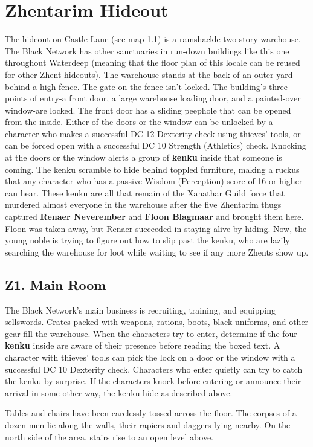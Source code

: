 \documentclass[10pt,a4paper,twoside,twocolumn,openany,nodeprecatedcode]{dndbook}
\begin{document}
\section{Zhentarim Hideout}
The hideout on Castle Lane (see map 1.1) is a ramshackle two-story warehouse. The Black Network has other sanctuaries in run-down buildings like this one throughout Waterdeep (meaning that the floor plan of this locale can be reused for other Zhent hideouts).
The warehouse stands at the back of an outer yard behind a high fence. The gate on the fence isn't locked. The building's three points of entry-a front door, a large warehouse loading door, and a painted-over window-are locked. The front door has a sliding peephole that can be opened from the inside. Either of the doors or the window can be unlocked by a character who makes a successful DC 12 Dexterity check using thieves' tools, or can be forced open with a successful DC 10 Strength (Athletics) check.
Knocking at the doors or the window alerts a group of \textbf{kenku} inside that someone is coming. The kenku scramble to hide behind toppled furniture, making a ruckus that any character who has a passive Wisdom (Perception) score of 16 or higher can hear. These kenku are all that remain of the Xanathar Guild force that murdered almost everyone in the warehouse after the five Zhentarim thugs captured \textbf{Renaer Neverember} and \textbf{Floon Blagmaar} and brought them here. Floon was taken away, but Renaer succeeded in staying alive by hiding. Now, the young noble is trying to figure out how to slip past the kenku, who are lazily searching the warehouse for loot while waiting to see if any more Zhents show up.
\subsection{Z1. Main Room}
The Black Network's main business is recruiting, training, and equipping sellswords. Crates packed with weapons, rations, boots, black uniforms, and other gear fill the warehouse.
When the characters try to enter, determine if the four \textbf{kenku} inside are aware of their presence before reading the boxed text.
A character with thieves' tools can pick the lock on a door or the window with a successful DC 10 Dexterity check. Characters who enter quietly can try to catch the kenku by surprise. If the characters knock before entering or announce their arrival in some other way, the kenku hide as described above.
\begin{DndReadAloud}{}
Tables and chairs have been carelessly tossed across the floor. The corpses of a dozen men lie along the walls, their rapiers and daggers lying nearby. On the north side of the area, stairs rise to an open level above.
\end{DndReadAloud}
\end{document}
